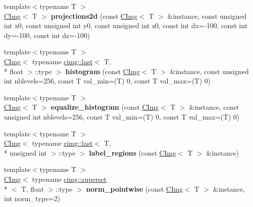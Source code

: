 \begin{DoxyCompactItemize}
\item 
\hypertarget{namespacecimg__library_a3f692169eed013b7fd65bbe1f7b0a9c6}{{\footnotesize template$<$typename T $>$ }\\\hyperlink{structcimg__library_1_1_c_img}{C\-Img}$<$ T $>$ {\bfseries projections2d} (const \hyperlink{structcimg__library_1_1_c_img}{C\-Img}$<$ T $>$ \&instance, const unsigned int x0, const unsigned int y0, const unsigned int z0, const int dx=-\/100, const int dy=-\/100, const int dz=-\/100)}\label{namespacecimg__library_a3f692169eed013b7fd65bbe1f7b0a9c6}

\item 
\hypertarget{namespacecimg__library_aad1f931b9fff50843e5ea02cc6cbd891}{{\footnotesize template$<$typename T $>$ }\\\hyperlink{structcimg__library_1_1_c_img}{C\-Img}$<$ typename \hyperlink{structcimg__library_1_1cimg_1_1last}{cimg\-::last}$<$ T, \\*
float $>$\-::type $>$ {\bfseries histogram} (const \hyperlink{structcimg__library_1_1_c_img}{C\-Img}$<$ T $>$ \&instance, const unsigned int nblevels=256, const T val\-\_\-min=(T) 0, const T val\-\_\-max=(T) 0)}\label{namespacecimg__library_aad1f931b9fff50843e5ea02cc6cbd891}

\item 
\hypertarget{namespacecimg__library_a783e10c61968f02494bcaf4e27715af7}{{\footnotesize template$<$typename T $>$ }\\\hyperlink{structcimg__library_1_1_c_img}{C\-Img}$<$ T $>$ {\bfseries equalize\-\_\-histogram} (const \hyperlink{structcimg__library_1_1_c_img}{C\-Img}$<$ T $>$ \&instance, const unsigned int nblevels=256, const T val\-\_\-min=(T) 0, const T val\-\_\-max=(T) 0)}\label{namespacecimg__library_a783e10c61968f02494bcaf4e27715af7}

\item 
\hypertarget{namespacecimg__library_aaa8627fd161efc70b6c6f35fa4dc148c}{{\footnotesize template$<$typename T $>$ }\\\hyperlink{structcimg__library_1_1_c_img}{C\-Img}$<$ typename \hyperlink{structcimg__library_1_1cimg_1_1last}{cimg\-::last}$<$ T, \\*
unsigned int $>$\-::type $>$ {\bfseries label\-\_\-regions} (const \hyperlink{structcimg__library_1_1_c_img}{C\-Img}$<$ T $>$ \&instance)}\label{namespacecimg__library_aaa8627fd161efc70b6c6f35fa4dc148c}

\item 
\hypertarget{namespacecimg__library_ab57727629f2deed0f95dda937bf4f550}{{\footnotesize template$<$typename T $>$ }\\\hyperlink{structcimg__library_1_1_c_img}{C\-Img}$<$ typename \hyperlink{structcimg__library_1_1cimg_1_1superset}{cimg\-::superset}\\*
$<$ T, float $>$\-::type $>$ {\bfseries norm\-\_\-pointwise} (const \hyperlink{structcimg__library_1_1_c_img}{C\-Img}$<$ T $>$ \&instance, int norm\-\_\-type=2)}\label{namespacecimg__library_ab57727629f2deed0f95dda937bf4f550}


\end{DoxyCompactItemize}
